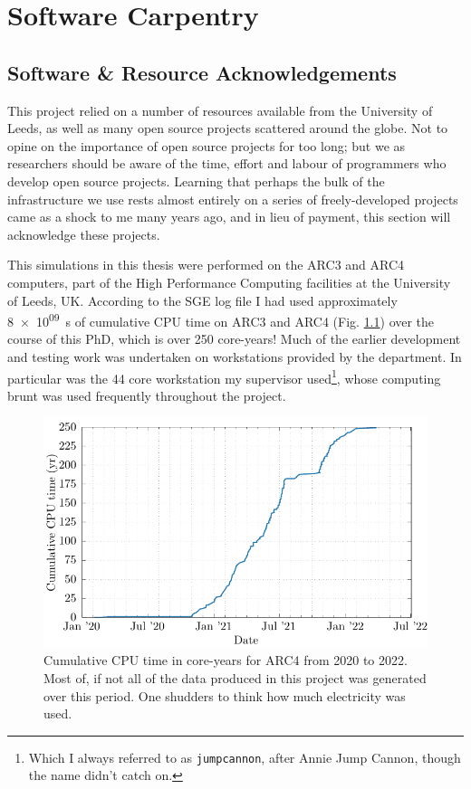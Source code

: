\chapter{Software Carpentry}

\section{Software \& Resource Acknowledgements}

This project relied on a number of resources available from the University of Leeds, as well as many open source projects scattered around the globe.
Not to opine on the importance of open source projects for too long; but we as researchers should be aware of the time, effort and labour of programmers who develop open source projects.
Learning that perhaps the bulk of the infrastructure we use rests almost entirely on a series of freely-developed projects came as a shock to me many years ago, and in lieu of payment, this section will acknowledge these projects.

This simulations in this thesis were performed on the ARC3 and ARC4 computers, part of the High Performance Computing facilities at the University of Leeds, UK.
According to the SGE log file I had used approximately \SI{8e+09}{s} of cumulative CPU time on ARC3 and ARC4 (Fig. \ref{fig:cpugraph}) over the course of this PhD, which is over \num{250} core-years!
Much of the earlier development and testing work was undertaken on workstations provided by the department.
In particular was the 44 core workstation my supervisor used\footnote{Which I always referred to as \texttt{jumpcannon}, after Annie Jump Cannon, though the name didn't catch on.}, whose computing brunt was used frequently throughout the project.

\begin{figure}
  \centering
  \includegraphics[]{assets/cpu_time.pdf}
  \caption[Cumulative CPU time on ARC4]{Cumulative CPU time in core-years for ARC4 from 2020 to 2022. Most of, if not all of the data produced in this project was generated over this period. One shudders to think how much electricity was used.}
  \label{fig:cpugraph}
\end{figure}

